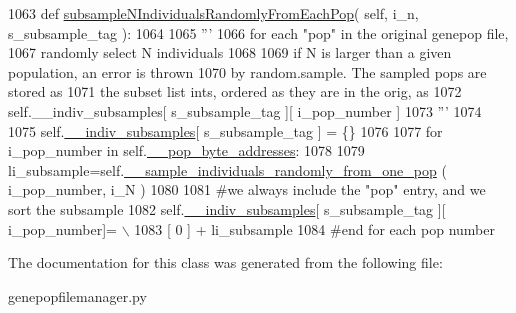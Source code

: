 \begin{DoxyCode}
1063     \textcolor{keyword}{def }\hyperlink{classnegui_1_1genepopfilemanager_1_1GenepopFileManager_affaeb9457d84736dc1f289d600808f56}{subsampleNIndividualsRandomlyFromEachPop}( self, i\_n, 
      s\_subsample\_tag ):
1064 
1065         \textcolor{stringliteral}{'''}
1066 \textcolor{stringliteral}{        for each "pop" in the original genepop file,}
1067 \textcolor{stringliteral}{        randomly select N individuals}
1068 \textcolor{stringliteral}{        }
1069 \textcolor{stringliteral}{        if N is larger than a given population, an error is thrown}
1070 \textcolor{stringliteral}{        by random.sample.  The sampled pops are stored as }
1071 \textcolor{stringliteral}{        the subset list ints, ordered as they are in the orig, as       }
1072 \textcolor{stringliteral}{        self.\_\_indiv\_subsamples[ s\_subsample\_tag ][ i\_pop\_number ]}
1073 \textcolor{stringliteral}{        '''}
1074 
1075         self.\hyperlink{classnegui_1_1genepopfilemanager_1_1GenepopFileManager_a1e8379bcee4902ca9314ff53fcb71644}{\_\_indiv\_subsamples}[ s\_subsample\_tag ] = \{\}
1076 
1077         \textcolor{keywordflow}{for} i\_pop\_number \textcolor{keywordflow}{in} self.\hyperlink{classnegui_1_1genepopfilemanager_1_1GenepopFileManager_ae24c2bdd19136a345bdb42fd49c5d91f}{\_\_pop\_byte\_addresses}:
1078             
1079             li\_subsample=self.\hyperlink{classnegui_1_1genepopfilemanager_1_1GenepopFileManager_a9818467c9cb40f8e1de0c6cc7f52e263}{\_\_sample\_individuals\_randomly\_from\_one\_pop}
      ( i\_pop\_number, i\_N )
1080 
1081             \textcolor{comment}{#we always include the "pop" entry, and we sort the subsample}
1082             self.\hyperlink{classnegui_1_1genepopfilemanager_1_1GenepopFileManager_a1e8379bcee4902ca9314ff53fcb71644}{\_\_indiv\_subsamples}[ s\_subsample\_tag ][ i\_pop\_number]= \(\backslash\)
1083                      [ 0 ] +  li\_subsample
1084         \textcolor{comment}{#end for each pop number}
\end{DoxyCode}


The documentation for this class was generated from the following file\+:\begin{DoxyCompactItemize}
\item 
genepopfilemanager.\+py\end{DoxyCompactItemize}
